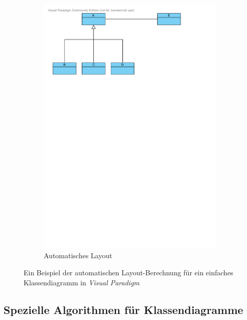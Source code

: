 \begin{figure}[hbt]
\begin{subfigure}{\rightsubfigurewidth}
        \includegraphics[scale=\graphicsscale]{resources/visual-paradigm-auto-layout-b}
        \caption{Automatisches Layout}
        \label{fig:visual-paradigm-auto-layout-b}
    \end{subfigure}
    \caption{Ein Beispiel der automatischen Layout-Berechnung für ein einfaches Klassendiagramm in \textit{Visual Paradigm}}
    \label{fig:visual-paradigm-auto-layout}
\end{figure}

\subsection{Spezielle Algorithmen für Klassendiagramme}
\label{subsec:special-algorithms-for-class-diagrams}

